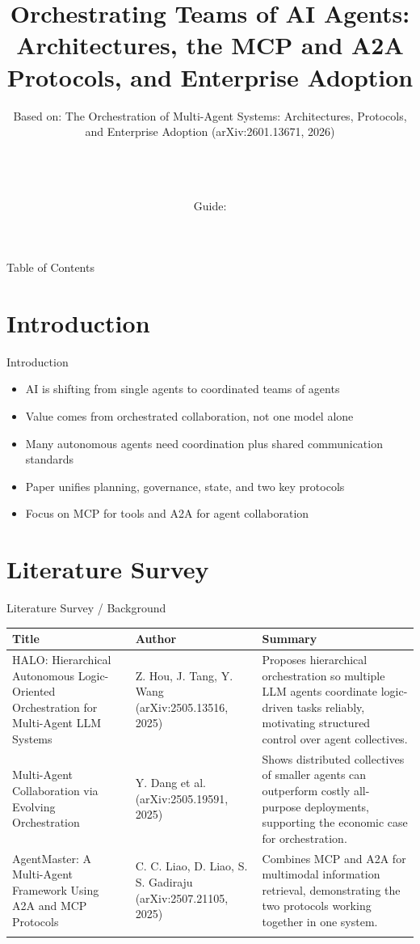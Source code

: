 \documentclass[10pt]{beamer}
\title[B.Tech Seminar]{Orchestrating Teams of AI Agents: Architectures, the MCP and A2A Protocols, and Enterprise Adoption}
\subtitle{Based on: The Orchestration of Multi-Agent Systems: Architectures, Protocols, and Enterprise Adoption (arXiv:2601.13671, 2026)}
\author[\studentname\ (\shortinst)]{\studentname \\ \small \rollno \\ \small \rollclass \\ \small Guide: \guidename}
\institute[]{\deptname \\ \collegename}
\date{\seminardate}
\begin{document}
\begin{frame}[plain]
  \titlepage
\end{frame}

\begin{frame}{Table of Contents}
  \tableofcontents
\end{frame}

\section{Introduction}
\begin{frame}{Introduction}
\begin{itemize}
  \item AI is shifting from single agents to coordinated teams of agents
  \item Value comes from orchestrated collaboration, not one model alone
  \item Many autonomous agents need coordination plus shared communication standards
  \item Paper unifies planning, governance, state, and two key protocols
  \item Focus on MCP for tools and A2A for agent collaboration
\end{itemize}
\end{frame}

\section{Literature Survey}
\begin{frame}{Literature Survey / Background}
  \small
  \begin{tabular}{@{}p{2.7cm}p{2.3cm}p{5.6cm}@{}}
    \toprule
    \textbf{Title} & \textbf{Author} & \textbf{Summary} \\
    \midrule
    HALO: Hierarchical Autonomous Logic-Oriented Orchestration for Multi-Agent LLM Systems & Z. Hou, J. Tang, Y. Wang (arXiv:2505.13516, 2025) & Proposes hierarchical orchestration so multiple LLM agents coordinate logic-driven tasks reliably, motivating structured control over agent collectives. \\
    \addlinespace
    Multi-Agent Collaboration via Evolving Orchestration & Y. Dang et al. (arXiv:2505.19591, 2025) & Shows distributed collectives of smaller agents can outperform costly all-purpose deployments, supporting the economic case for orchestration. \\
    \addlinespace
    AgentMaster: A Multi-Agent Framework Using A2A and MCP Protocols & C. C. Liao, D. Liao, S. S. Gadiraju (arXiv:2507.21105, 2025) & Combines MCP and A2A for multimodal information retrieval, demonstrating the two protocols working together in one system. \\
    \addlinespace
    \bottomrule
  \end{tabular}
\end{frame}
\end{document}
